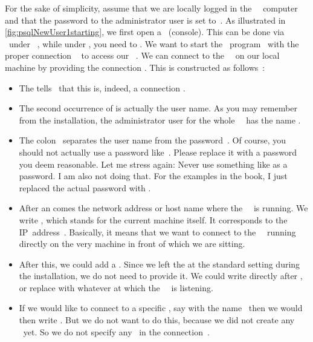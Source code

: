 %
%

For the sake of simplicity, assume that we are locally logged in the \db~\server\ computer and that the password to the administrator user  is set to~.
As illustrated in \cref{fig:psqlNewUser1starting}, we first open a ~(console).
This can be done via \ubuntuTerminal\ under \ubuntu\ \linux, while under \microsoftWindows, you need to \windowsTerminal.
We want to start the \client\ program \psql\ with the proper connection ~\cite{PGDG:PD:CU} to access our \postgresql\ \server.%
%
%
%
We can connect to the \postgresql\ \server\ on our local machine by providing the connection  .
This  is constructed as follows~\cite{PGDG:PD:CU}:%
%
\begin{itemize}%
%
\item The  tells \psql\ that this is, indeed, a connection .
%
\item The second occurrence of  is actually the user name.
As you may remember from the installation, the administrator user for the whole \postgresql\ \server\ has the name .%
%
\item The colon~\inQuotes{\textil{:}} separates the user name from the password~.
Of course, you should not actually use a password like~.
Please replace it with a password you deem reasonable.
Let me stress again:
Never use something like  as a password.
I am also not doing that.
For the examples in the book, I just replaced the actual password with .
%
\item After an  comes the network address or host name where the \postgresql\ \server\ is running.
We write \localhost, which stands for the current machine itself.
It corresponds to the IP~address~.
Basically, it means that we want to connect to the \postgresql\ \server\ running directly on the very machine in front of which we are sitting.%
%
\item After this, we could add a .
Since we left the   at the standard setting during the installation, we do not need to provide it.
We could write  directly after \localhost, or replace  with whatever  at which the \postgresql\ \server\ is listening.%
%
\item If we would like to connect to a specific \db, say with the name~ then we would then write .
But we do not want to do this, because we did not create any \db\ yet.
So we do not specify any \db\ in the connection~.%
\end{itemize}%
